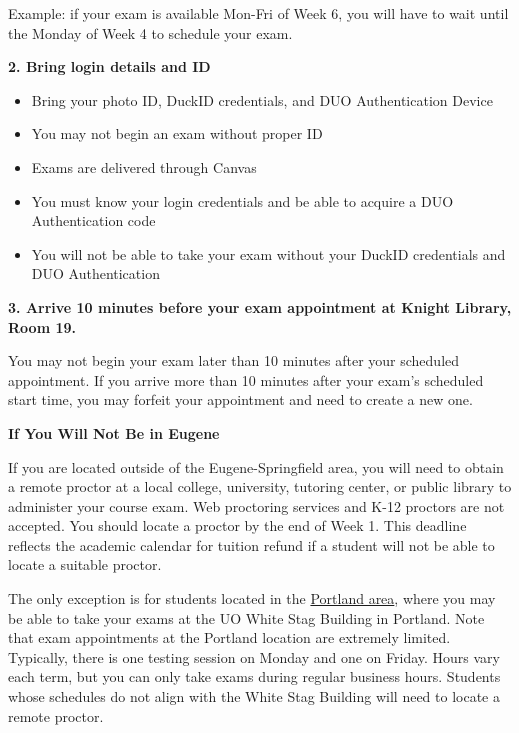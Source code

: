 \documentclass[10pt]{article}
\begin{document}
\bigskip

\noindent Example: if your exam is available Mon-Fri of Week 6, you will have to wait until the Monday of Week 4 to schedule your exam. 

\bigskip

\textbf{2. Bring login details and ID}
\begin{itemize}
	\item Bring your photo ID, DuckID credentials, and DUO Authentication Device
	\item You may not begin an exam without proper ID
	\item Exams are delivered through Canvas
	\item You must know your login credentials and be able to acquire a DUO Authentication code
	\item You will not be able to take your exam without your DuckID credentials and DUO Authentication
\end{itemize}

\bigskip

\textbf{ 3. Arrive 10 minutes before your exam appointment at Knight Library, Room 19.}

\bigskip

\noindent You may not begin your exam later than 10 minutes after your scheduled appointment. If you arrive more than 10 minutes after your exam’s scheduled start time, you may forfeit your appointment and need to create a new one. 

\bigskip

\textbf{If You Will Not Be in Eugene}

\bigskip

\noindent If you are located outside of the Eugene-Springfield area, you will need to obtain a remote proctor at a local college, university, tutoring center, or public library to administer your course exam. Web proctoring services and K-12 proctors are not accepted. You should locate a proctor by the end of Week 1. This deadline reflects the academic calendar for tuition refund if a student will not be able to locate a suitable proctor.

\bigskip 

\noindent The only exception is for students located in the \href{https://online.uoregon.edu/off-campus-proctoring#portland}{Portland area}, where you may be able to take your exams at the UO White Stag Building in Portland. Note that exam appointments at the Portland location are extremely limited. Typically, there is one testing session on Monday and one on Friday. Hours vary each term, but you can only take exams during regular business hours. Students whose schedules do not align with the White Stag Building will need to locate a remote proctor.  
\end{document}
